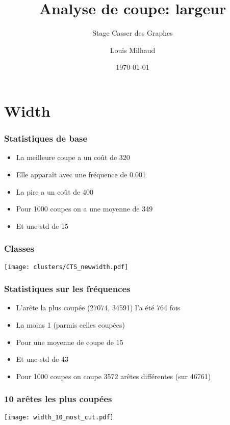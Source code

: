 \documentclass[aspectratio=169]{beamer}
\title{Analyse de coupe: largeur}
\subtitle{Stage Casser des Graphes}
\author{Louis Milhaud}
\institute{Complex Networks - LIP6}
\date{\today}
\begin{document}
    \begin{frame}
        \titlepage
    \end{frame}

    \section{Width}
    \begin{frame}
        \frametitle{Statistiques de base}

        \begin{itemize}
            \item La meilleure coupe a un coût de 320
            \item Elle apparaît avec une fréquence de 0.001
            \item La pire a un coût de 400
            \item Pour 1000 coupes on a une moyenne de 349
            \item Et une std de 15
        \end{itemize}
    
    \end{frame}

    \begin{frame}
        \frametitle{Classes}
        \centering
        \texttt{[image: clusters/CTS\_newwidth.pdf]}
    \end{frame}

    \begin{frame}
        \frametitle{Statistiques sur les fréquences}
        
        \begin{itemize}
            \item L'arête la plus coupée (27074, 34591) l'a été 764 fois
            \item La moins 1 (parmis celles coupées)
            \item Pour une moyenne de coupe de 15
            \item Et une std de 43
            \item Pour 1000 coupes on coupe 3572 arêtes différentes (sur 46761)
        \end{itemize}
    
    \end{frame}

    \begin{frame}
        \frametitle{10 arêtes les plus coupées}
        \centering
        \texttt{[image: width\_10\_most\_cut.pdf]}
    \end{frame}
\end{document}
